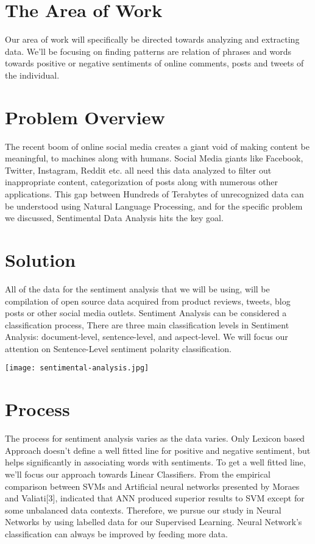 \section{The Area of Work}
Our area of work will specifically be directed towards analyzing and extracting data. We'll be focusing on finding patterns are relation of phrases and words towards positive or negative sentiments of online comments, posts and tweets of the individual.
 

\section{Problem Overview}
The recent boom of online social media creates a giant void of making content be meaningful, to machines along with humans. Social Media giants like Facebook, Twitter, Instagram, Reddit etc. all need this data analyzed to filter out inappropriate content, categorization of posts along with numerous other applications. 
This gap between Hundreds of Terabytes of unrecognized data can be understood using Natural Language Processing, and for the specific problem we discussed, Sentimental Data Analysis hits the key goal.

\section{Solution}
All of the data for the sentiment analysis that we will be using, will be compilation of open source data acquired from product reviews, tweets, blog posts or other social media outlets. Sentiment Analysis can be considered a classification process, There are three main classification levels in Sentiment Analysis: document-level, sentence-level, and aspect-level. We will focus our attention on Sentence-Level sentiment polarity classification.\newline

\texttt{[image: sentimental-analysis.jpg]}\newline
\cite{1} 

\section{Process}
The process for sentiment analysis varies as the data varies. Only Lexicon based Approach doesn't define a well fitted line for positive and negative sentiment, but helps significantly in associating words with sentiments. To get a well fitted line, we'll focus our approach towards Linear Classifiers. From the empirical comparison between SVMs and Artificial neural networks presented by Moraes and Valiati[3], indicated that ANN produced superior results to SVM except for some unbalanced data contexts. Therefore, we pursue our study in Neural Networks by using labelled data for our Supervised Learning. Neural Network's classification can always be improved by feeding more data.\newline

